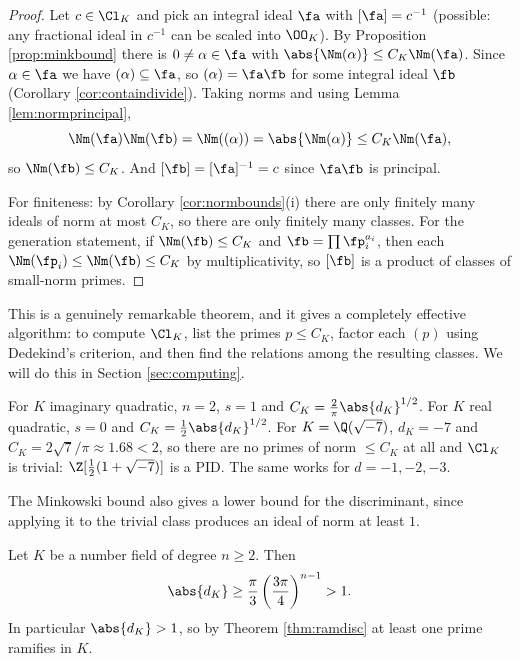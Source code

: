 \begin{proof}
	Let $c \in \Cl_K$ and pick an integral ideal $\fa$ with $[\fa] = c^{-1}$ (possible: any fractional ideal in $c^{-1}$ can be scaled into $\OO_K$). By Proposition \ref{prop:minkbound} there is $0 \neq \alpha\in\fa$ with $\abs{\Nm(\alpha)} \le C_K\Nm(\fa)$. Since $\alpha \in \fa$ we have $(\alpha) \subseteq \fa$, so $(\alpha) = \fa\fb$ for some integral ideal $\fb$ (Corollary \ref{cor:containdivide}). Taking norms and using Lemma \ref{lem:normprincipal},
	$$\Nm(\fa)\Nm(\fb) = \Nm((\alpha)) = \abs{\Nm(\alpha)} \le C_K\Nm(\fa),$$
	so $\Nm(\fb) \le C_K$. And $[\fb] = [\fa]^{-1} = c$ since $\fa\fb$ is principal.

	For finiteness: by Corollary \ref{cor:normbounds}(i) there are only finitely many ideals of norm at most $C_K$, so there are only finitely many classes. For the generation statement, if $\Nm(\fb)\le C_K$ and $\fb = \prod\fp_i^{a_i}$, then each $\Nm(\fp_i) \le \Nm(\fb) \le C_K$ by multiplicativity, so $[\fb]$ is a product of classes of small-norm primes.
\end{proof}

This is a genuinely remarkable theorem, and it gives a completely effective algorithm: to compute $\Cl_K$, list the primes $p \le C_K$, factor each $(p)$ using Dedekind's criterion, and then find the relations among the resulting classes. We will do this in Section \ref{sec:computing}.

\begin{example}
	For $K$ imaginary quadratic, $n=2$, $s=1$ and $C_K = \frac{2}{\pi}\abs{d_K}^{1/2}$. For $K$ real quadratic, $s = 0$ and $C_K = \tfrac12\abs{d_K}^{1/2}$. For $K = \Q(\sqrt{-7})$, $d_K = -7$ and $C_K = 2\sqrt7/\pi \approx 1.68 < 2$, so there are no primes of norm $\le C_K$ at all and $\Cl_K$ is trivial: $\Z[\tfrac12(1+\sqrt{-7})]$ is a PID. The same works for $d = -1,-2,-3$.
\end{example}

The Minkowski bound also gives a lower bound for the discriminant, since applying it to the trivial class produces an ideal of norm at least $1$.

\begin{theorem}\label{thm:hermite}
	Let $K$ be a number field of degree $n \geq 2$. Then
	$$\abs{d_K} \ge \frac{\pi}{3}\left(\frac{3\pi}{4}\right)^{n-1} > 1.$$
	In particular $\abs{d_K} > 1$, so by Theorem \ref{thm:ramdisc} at least one prime ramifies in $K$.
\end{theorem}

